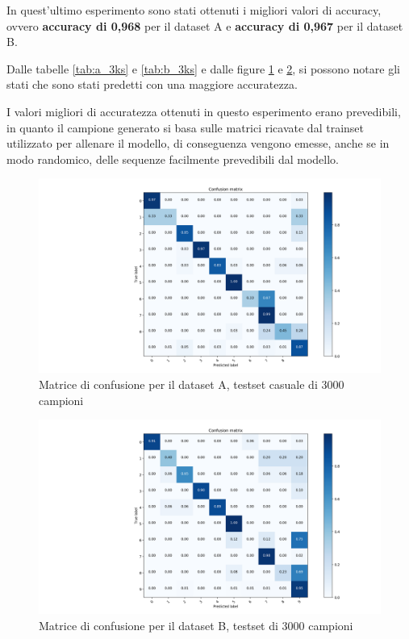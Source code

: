 \documentclass[10pt,a4paper]{article}
\begin{document}
	In quest'ultimo esperimento sono stati ottenuti i migliori valori di accuracy, ovvero \textbf{accuracy di 0,968} per il dataset A e \textbf{accuracy di 0,967} per il dataset B.
	
	Dalle tabelle \ref{tab:a_3ks} e \ref{tab:b_3ks} e dalle figure \ref{fig:a_3ks} e \ref{fig:b_3ks}, si possono notare gli stati che sono stati predetti con una maggiore accuratezza.
	
	I valori migliori di accuratezza ottenuti in questo esperimento erano prevedibili, in quanto il campione generato si basa sulle matrici ricavate dal trainset utilizzato per allenare il modello, di conseguenza vengono emesse, anche se in modo randomico, delle sequenze facilmente prevedibili dal modello. 
	
	
	
	
	\begin{figure}[!htbp]
	\includegraphics[width=\linewidth]{immagini/confusion_matrix/a_3ks.png}
	\caption{Matrice di confusione per il dataset A, testset casuale di 3000 campioni}
	\label{fig:a_3ks}
	\end{figure}
	
	\begin{figure}[!htbp]
	\includegraphics[width=\linewidth]{immagini/confusion_matrix/b_3ks.png}
	\caption{Matrice di confusione per il dataset B, testset di 3000 campioni}
	\label{fig:b_3ks}
	\end{figure}
	
\end{document}
